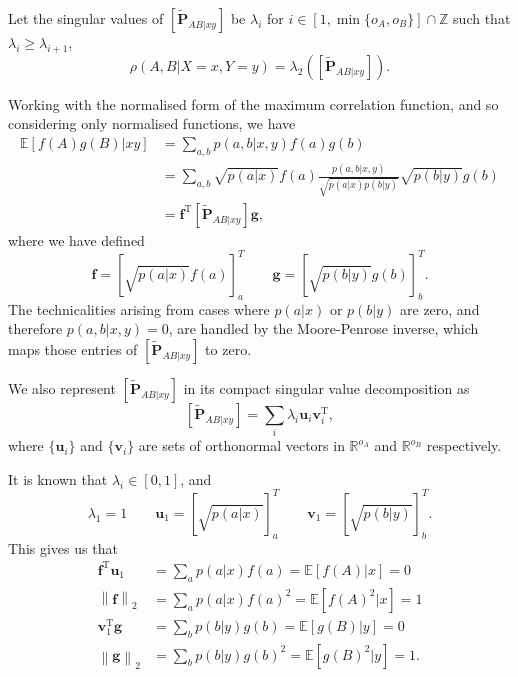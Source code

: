 \documentclass[10pt, a4paper]{article}
\newcommand{\norm}[1]{\left\lVert#1\right\rVert}
\newcommand{\?}{\mathrel{?}} %
\newcommand{\Z}{\mathbb{Z}} %
\newcommand{\R}{\mathbb{R}} %
\newcommand{\cvec}[1]{\boldsymbol{\mathbf{#1}}}    %
\newcommand{\rvec}[1]{\boldsymbol{\mathbf{#1}}^{\mathrm{T}}} %
\newcommand{\matrp}[2]{\left[\mathbf{#1}#2\right]} %
\newcommand{\E}{\mathbb{E}} %
\numberwithin{equation}{section} %
\theoremstyle{definition}
\theoremstyle{plain}
\theoremstyle{plain}
\begin{document}
    Let the singular values of \(\matrp{\tilde{P}}{_{AB|xy}}\) be \(\lambda_i\) for \(i \in [1, \min\{o_A, o_B\}] \cap \Z\) such that \(\lambda_{i} \geq \lambda_{i+1}\),
    \begin{equation}
      \rho(A,B|X=x,Y=y) = \lambda_2\left( \matrp{\tilde{P}}{_{AB|xy}} \right).
    \end{equation}

    Working with the normalised form of the maximum correlation function, and so considering only normalised functions, we have
    \begin{align}
      \E[f(A)g(B)|xy] &= \sum_{a,b} p(a,b|x,y) f(a)g(b) \\
                      &= \sum_{a,b} \sqrt{p(a|x)} f(a) \frac{p(a,b|x,y)}{\sqrt{p(a|x)p(b|y)}} \sqrt{p(b|y)} g(b) \\
                      &= \rvec{f} \matrp{\tilde{P}}{_{AB|xy}} \cvec{g},
    \end{align}
    where we have defined
    \begin{equation}
      \cvec{f} = {[\sqrt{p(a|x)} f(a)]}^T_a \qquad \cvec{g} = {[\sqrt{p(b|y)} g(b)]}^T_b.
    \end{equation}
    The technicalities arising from cases where \(p(a|x)\) or \(p(b|y)\) are zero, and therefore \(p(a,b|x,y) = 0\), are handled by the Moore-Penrose inverse, which maps those entries of \(\matrp{\tilde{P}}{_{AB|xy}}\) to zero.

    We also represent \(\matrp{\tilde{P}}{_{AB|xy}}\) in its compact singular value decomposition as
    \begin{equation}
      \matrp{\tilde{P}}{_{AB|xy}} = \sum_i \lambda_i \cvec{u}_i \rvec{v}_i,
    \end{equation}
    where \(\{\cvec{u}_i\}\) and \(\{\cvec{v}_i\}\) are sets of orthonormal vectors in \(\R^{o_A}\) and \(\R^{o_B}\) respectively.

    It is known that \(\lambda_i \in [0, 1]\), and
    \begin{equation}
      \lambda_1 = 1 \qquad \cvec{u}_1 = {[\sqrt{p(a|x)}]}_a^T \qquad \cvec{v}_1 = {[\sqrt{p(b|y)}]}_b^T.
    \end{equation}
    This gives us that
    \begin{align}
      \rvec{f} \cvec{u}_1 &= \sum_a p(a|x) f(a) = \E[f(A)|x] = 0 \\
      \norm{\cvec{f}}_2 &= \sum_a p(a|x) {f(a)}^2 = \E[{f(A)}^2|x] = 1 \\
      \rvec{v}_1 \cvec{g} &= \sum_b p(b|y) g(b) = \E[g(B)|y] = 0 \\
      \norm{\cvec{g}}_2 &= \sum_b p(b|y) {g(b)}^2 = \E[{g(B)}^2|y] = 1.
    \end{align}
\end{document}
